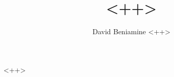 \documentclass{article}
\author{David Beniamine <++>}
\title{<++> }
\begin{document}

\maketitle%
\begin{center}
    \tableofcontents%
\end{center}
\newpage%


<++>


%




\end{document}
